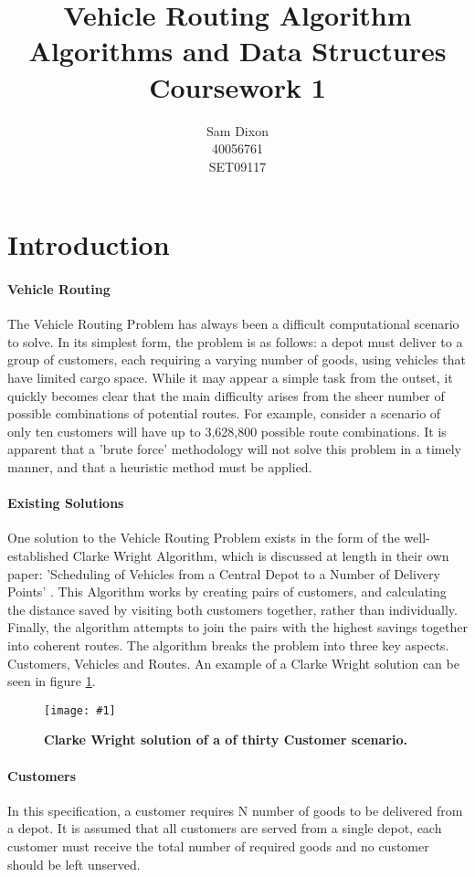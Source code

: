 \documentclass[conference]{acmsiggraph}
\title{Vehicle Routing Algorithm\\Algorithms and Data Structures\\Coursework 1}
\author{Sam Dixon\\40056761\\SET09117}
\newcommand{\figuremacroW}[4]{
	\begin{figure}[h] %
		\centering
		\texttt{[image: \#1]}
		\caption[#2]{\textbf{#2}  #3}
		\label{fig:#1}
	\end{figure}
}
\begin{document}
\fancyfoot{\thepage}
	\maketitle	
	\section{Introduction}
	
		\paragraph{Vehicle Routing}
		The Vehicle Routing Problem has always been a difficult computational scenario to solve. In its simplest form, the problem is as follows: a depot must deliver to a group of customers, each requiring a varying number of goods, using vehicles that have limited cargo space. While it may appear a simple task from the outset, it quickly becomes clear that the main difficulty arises from the sheer number of possible combinations of potential routes. For example, consider a scenario of only ten customers will have up to 3,628,800 possible route combinations. It is apparent that a 'brute force' methodology will not solve this problem in a timely manner, and that a heuristic method must be applied.
		
		\paragraph{Existing Solutions}
		One solution to the Vehicle Routing Problem exists in the form of the well-established Clarke Wright Algorithm, which is discussed at length in their own paper: 'Scheduling of Vehicles from a Central Depot to a Number of Delivery Points' \cite{CW}. This Algorithm works by creating pairs of customers, and calculating the distance saved by visiting both customers together, rather than individually. Finally, the algorithm attempts to join the pairs with the highest savings together into coherent routes. The algorithm breaks the problem into three key aspects. Customers, Vehicles and Routes. An example of a Clarke Wright solution can be seen in figure \ref{fig:cw30}. 
		
		\figuremacroW
		{cw30}
		{Clarke Wright solution of a of thirty Customer scenario.}
		{}
		{0.75}
						
		\paragraph{Customers}
		In this specification, a customer requires N number of goods to be delivered from a depot. It is assumed that all customers are served from a single depot, each customer must receive the total number of required goods and no customer should be left unserved.
		
\end{document}
